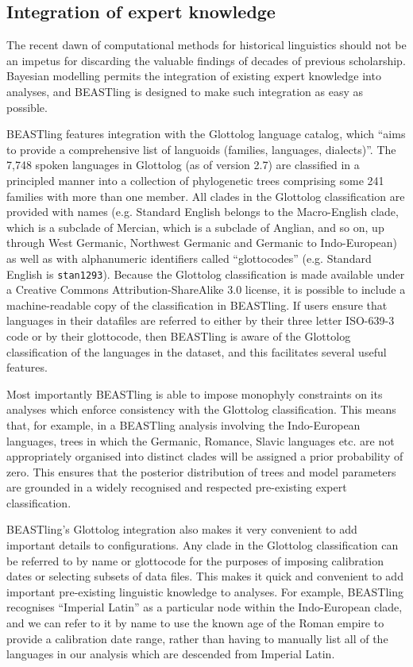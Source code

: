 \documentclass[10pt,a4paper]{article}
\begin{document}
\subsection{Integration of expert knowledge}

The recent dawn of computational methods for historical linguistics should not be an impetus for discarding the valuable findings of decades of previous scholarship.  Bayesian modelling permits the integration of existing expert knowledge into analyses, and BEASTling is designed to make such integration as easy as possible.

BEASTling features integration with the Glottolog language catalog\cite{Hammarstroem2016}, which ``aims to provide a comprehensive list of languoids (families, languages, dialects)''.  The  7,748 spoken languages in Glottolog (as of version 2.7) are classified in a principled manner into a collection of phylogenetic trees comprising some 241 families with more than one member.  All clades in the Glottolog classification are provided with names (e.g. Standard English belongs to the Macro-English clade, which is a subclade of Mercian, which is a subclade of Anglian, and so on, up through West Germanic, Northwest Germanic and Germanic to Indo-European) as well as with alphanumeric identifiers called ``glottocodes'' (e.g. Standard English is \texttt{stan1293}).  Because the Glottolog classification is made available under a Creative Commons Attribution-ShareAlike 3.0 license, it is possible to include a machine-readable copy of the classification in BEASTling.  If users ensure that languages in their datafiles are referred to either by their three letter ISO-639-3 code or by their glottocode, then BEASTling is aware of the Glottolog classification of the languages in the dataset, and this facilitates several useful features.

Most importantly BEASTling is able to impose monophyly constraints on its analyses which enforce consistency with the Glottolog classification.  This means that, for example, in a BEASTling analysis involving the Indo-European languages, trees in which the Germanic, Romance, Slavic languages etc. are not appropriately organised into distinct clades will be assigned a prior probability of zero.  This ensures that the posterior distribution of trees and model parameters are grounded in a widely recognised and respected pre-existing expert classification.

BEASTling's Glottolog integration also makes it very convenient to add important details to configurations.  Any clade in the Glottolog classification can be referred to by name or glottocode for the purposes of imposing calibration dates or selecting subsets of data files.  This makes it quick and convenient to add important pre-existing linguistic knowledge to analyses.  For example, BEASTling recognises ``Imperial Latin'' as a particular node within the Indo-European clade, and we can refer to it by name to use the known age of the Roman empire to provide a calibration date range, rather than having to manually list all of the languages in our analysis which are descended from Imperial Latin.
\end{document}
